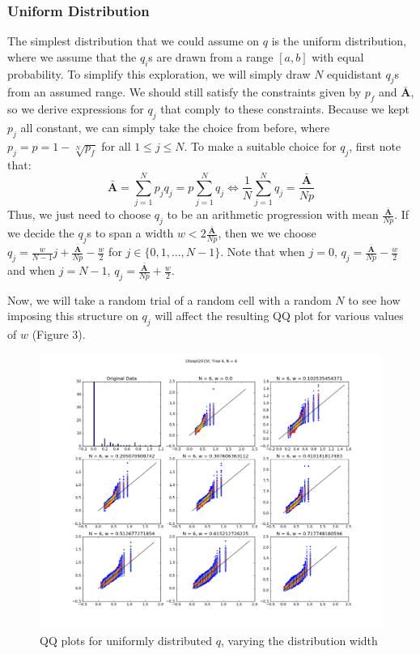 \documentclass{article}
\newcommand{\rv}[1] {
\text{$\bm{#1}$}
}
\begin{document}
\subsubsection{Uniform Distribution}
The simplest distribution that we could assume on $q$ is the uniform distribution, where we assume that  the $q_i$s are drawn from a range $[a,b]$ with equal probability. To simplify this exploration, we will simply draw $N$ equidistant $q_j$s from an assumed range. We should still satisfy the constraints given by $p_f$ and $\rv{\bar{A}}$, so we derive expressions for $q_j$ that comply to these constraints. Because we kept $p_j$ all constant, we can simply take the choice from before, where $p_j = p = 1 - \sqrt[N]{p_f}$ for all $1 \leq j \leq N$. To make a suitable choice for $q_j$, first note that:
\[
  \rv{\bar{A}} = \sum_{j=1}^N p_jq_j = p\sum_{j=1}^N q_j \iff \frac{1}{N}\sum_{j=1}^N q_j = \frac{\rv{\bar{A}}}{Np}
\]
Thus, we just need to choose $q_j$ to be an arithmetic progression with mean $\frac{\rv{\bar{A}}}{Np}$. If we decide the $q_j$s to span a width $w < 2\frac{\rv{\bar{A}}}{Np}$, then we we choose $q_j = \frac{w}{N-1}j + \frac{\rv{\bar{A}}}{Np} - \frac{w}{2}$ for $j \in \{0,1,...,N-1\}$. Note that when $j = 0$, $q_j = \frac{\rv{\bar{A}}}{Np} - \frac{w}{2}$ and when $j = N-1$, $q_j = \frac{\rv{\bar{A}}}{Np} + \frac{w}{2}$.

Now, we will take a random trial of a random cell with a random $N$ to see how imposing this structure on $q_j$ will affect the resulting QQ plot for various values of $w$ (Figure 3).

\begin{figure}[h]
  \centering
  \caption{QQ plots for uniformly distributed $q$, varying the distribution width}
  \includegraphics[width=1.0\textwidth]{10sept2015f-4-6-qq}
\end{figure}
\end{document}
